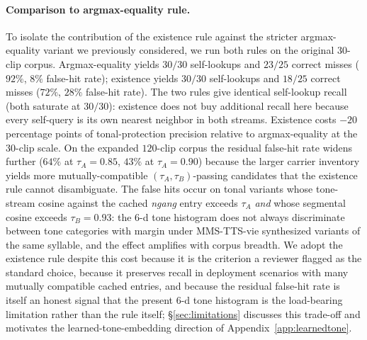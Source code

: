 \documentclass[a4paper,fleqn]{cas-dc}
\begin{document}
\paragraph{Comparison to argmax-equality rule.} To isolate the contribution of the existence rule against the stricter argmax-equality variant we previously considered, we run both rules on the original $30$-clip corpus. Argmax-equality yields $30/30$ self-lookups and $23/25$ correct misses ($92\%$, $8\%$ false-hit rate); existence yields $30/30$ self-lookups and $18/25$ correct misses ($72\%$, $28\%$ false-hit rate). The two rules give identical self-lookup recall (both saturate at $30/30$): existence does not buy additional recall here because every self-query is its own nearest neighbor in both streams. Existence costs $-20$ percentage points of tonal-protection precision relative to argmax-equality at the $30$-clip scale. On the expanded $120$-clip corpus the residual false-hit rate widens further ($64\%$ at $\tau_{A}=0.85$, $43\%$ at $\tau_{A}=0.90$) because the larger carrier inventory yields more mutually-compatible $(\tau_{A}, \tau_{B})$-passing candidates that the existence rule cannot disambiguate. The false hits occur on tonal variants whose tone-stream cosine against the cached \emph{ngang} entry exceeds $\tau_{A}$ \emph{and} whose segmental cosine exceeds $\tau_{B} = 0.93$: the 6-d tone histogram does not always discriminate between tone categories with margin under MMS-TTS-vie synthesized variants of the same syllable, and the effect amplifies with corpus breadth. We adopt the existence rule despite this cost because it is the criterion a reviewer flagged as the standard choice, because it preserves recall in deployment scenarios with many mutually compatible cached entries, and because the residual false-hit rate is itself an honest signal that the present $6$-d tone histogram is the load-bearing limitation rather than the rule itself; \S\ref{sec:limitations} discusses this trade-off and motivates the learned-tone-embedding direction of Appendix~\ref{app:learnedtone}.
\end{document}
